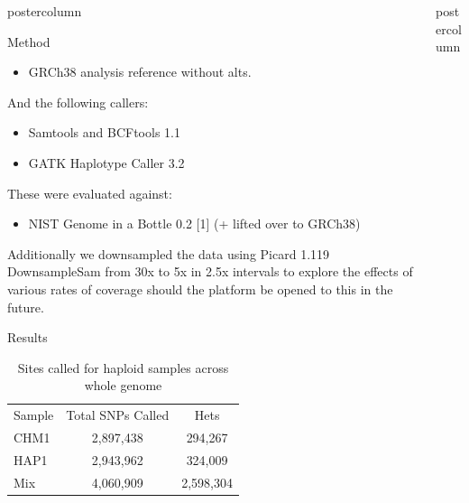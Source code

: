 \documentclass[final,xcolor=table]{beamer}
\begin{document}
\begin{frame}{}
\begin{columns}
\begin{column}{.49\textwidth}
\begin{beamercolorbox}[center,wd=\textwidth]{postercolumn}
\begin{minipage}[T]{.95\textwidth}
\begin{block}{Method}
\begin{itemize}
                    \item GRCh38 analysis reference without alts.
                \end{itemize}
              And the following callers:
                \begin{itemize} 
                    \item Samtools and BCFtools 1.1
                    \item GATK Haplotype Caller 3.2
                \end{itemize}
              These were evaluated against:
                \begin{itemize} 
                    \item NIST Genome in a Bottle 0.2 [1] (+ lifted over to GRCh38)
                \end{itemize}
                Additionally we downsampled the data using Picard 1.119 DownsampleSam from 30x to 5x in 2.5x intervals to explore the effects of various rates of coverage should the platform be opened to this in the future.
            \end{block}
            \begin{block}{Results}
            \begin{table}[h]

\begin{tabular}{|l|c|c|}
\hline
\rowcolor{sangerlightblue3}
Sample  & Total SNPs Called & Hets \\ \cline{1-3} %
CHM1 & 2,897,438 & 294,267  \\ %
HAP1 & 2,943,962 & 324,009 \\ %
Mix & 4,060,909 & 2,598,304   \\ \cline{1-3} %
\hline
\end{tabular}
\caption{Sites called for haploid samples across whole genome}
\label{table:1}
\end{table}

            \end{block}
            \vfill

            \end{minipage}
        \end{beamercolorbox}
    \end{column}
        \begin{column}{.49\textwidth}
        \begin{beamercolorbox}[center,wd=\textwidth]{postercolumn}
            \begin{minipage}[T]{.95\textwidth}  %



\end{minipage}
\end{beamercolorbox}
\end{column}
\end{columns}
\end{frame}
\end{document}

